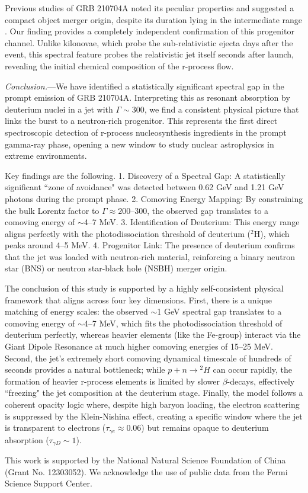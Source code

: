 \documentclass[aps,prl,twocolumn,superscriptaddress,showpacs,preprintnumbers,amsmath,amssymb,linenumbers]{revtex4-2}
\begin{document}
Previous studies of GRB 210704A noted its peculiar properties and suggested a compact object merger origin, despite its duration lying in the intermediate range \cite{2021GCN.30380....1M, 2023MNRAS.522.5204B}. Our finding provides a completely independent confirmation of this progenitor channel. Unlike kilonovae, which probe the sub-relativistic ejecta days after the event, this spectral feature probes the relativistic jet itself seconds after launch, revealing the initial chemical composition of the r-process flow.

\textit{Conclusion.}---We have identified a statistically significant spectral gap in the prompt emission of GRB 210704A. Interpreting this as resonant absorption by deuterium nuclei in a jet with $\Gamma \sim 300$, we find a consistent physical picture that links the burst to a neutron-rich progenitor. This represents the first direct spectroscopic detection of r-process nucleosynthesis ingredients in the prompt gamma-ray phase, opening a new window to study nuclear astrophysics in extreme environments.

Key findings are the following. 1. Discovery of a Spectral Gap: A statistically significant ``zone of avoidance" was detected between 0.62 GeV and 1.21 GeV photons during the prompt phase. 2. Comoving Energy Mapping: By constraining the bulk Lorentz factor to $\Gamma \approx 200–300$, the observed gap translates to a comoving energy of $\sim$4–7 MeV. 3. Identification of Deuterium: This energy range aligns perfectly with the photodissociation threshold of deuterium ($^2$H), which peaks around 4–5 MeV. 4. Progenitor Link: The presence of deuterium confirms that the jet was loaded with neutron-rich material, reinforcing a binary neutron star (BNS) or neutron star-black hole (NSBH) merger origin.

The conclusion of this study is supported by a highly self-consistent physical framework that aligns across four key dimensions. First, there is a unique matching of energy scales: the observed $\sim$1 GeV spectral gap translates to a comoving energy of $\sim$4–7 MeV, which fits the photodissociation threshold of deuterium perfectly, whereas heavier elements (like the Fe-group) interact via the Giant Dipole Resonance at much higher comoving energies of 15–25 MeV. Second, the jet's extremely short comoving dynamical timescale of hundreds of seconds provides a natural bottleneck; while $p+n \rightarrow {}^2H$ can occur rapidly, the formation of heavier r-process elements is limited by slower $\beta$-decays, effectively ``freezing" the jet composition at the deuterium stage. Finally, the model follows a coherent opacity logic where, despite high baryon loading, the electron scattering is suppressed by the Klein-Nishina effect, creating a specific window where the jet is transparent to electrons ($\tau_{\gamma e} \approx 0.06$) but remains opaque to deuterium absorption ($\tau_{\gamma D} \sim 1$).

\begin{acknowledgments}
This work is supported by the National Natural Science Foundation of China (Grant No. 12303052). We acknowledge the use of public data from the Fermi Science Support Center.
\end{acknowledgments}



\end{document}
